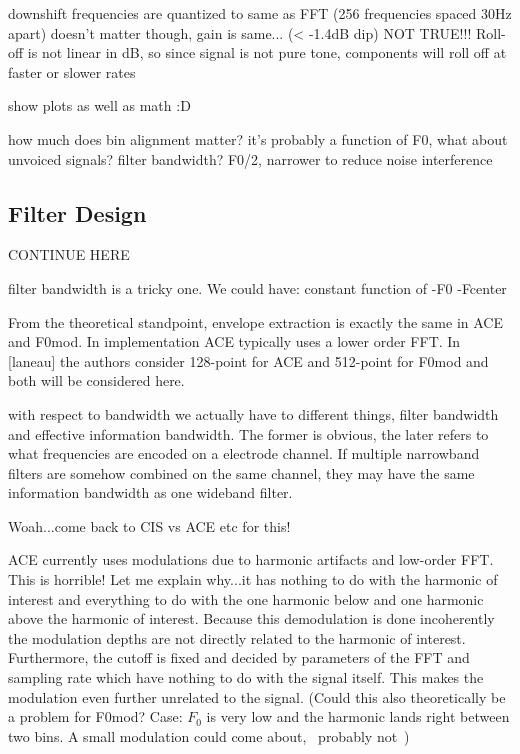 \documentclass [11pt, proquest] {uwthesis}[2015/03/03]
\begin{document}
downshift frequencies are quantized to same as FFT (256 frequencies spaced 30Hz apart)
doesn't matter though, gain is same... (< -1.4dB dip)
NOT TRUE!!! Roll-off is not linear in dB, so since signal is not pure tone, components will roll off at faster or slower rates

show plots as well as math :D

how much does bin alignment matter?  it's probably a function of F0, what about unvoiced signals?
filter bandwidth? F0/2, narrower to reduce noise interference


\subsection{Filter Design}

CONTINUE HERE

filter bandwidth is a tricky one.  We could have:
constant
function of
-F0
-Fcenter

From the theoretical standpoint, envelope extraction is exactly the same in ACE and F0mod.  In implementation ACE typically uses a lower order FFT.  In [laneau] the authors consider 128-point for ACE and 512-point for F0mod and both will be considered here.



		with respect to bandwidth we actually have to different things, filter bandwidth and effective information bandwidth.  The former is obvious, the later refers to what frequencies are encoded on a electrode channel.  If multiple narrowband filters are somehow combined on the same channel, they may have the same information bandwidth as one wideband filter.





Woah...come back to CIS vs ACE etc for this!

ACE currently uses modulations due to harmonic artifacts and low-order FFT.  This is horrible!  Let me explain why...it has nothing to do with the harmonic of interest and everything to do with the one harmonic below and one harmonic above the harmonic of interest.  Because this demodulation is done incoherently the modulation depths are not directly related to the harmonic of interest.  Furthermore, the cutoff is fixed and decided by parameters of the FFT and sampling rate which have nothing to do with the signal itself.  This makes the modulation even further unrelated to the signal.  (Could this also theoretically be a problem for F0mod?  Case: $F_0$ is very low and the harmonic lands right between two bins.  A small modulation could come about, ~probably not~)
\end{document}
